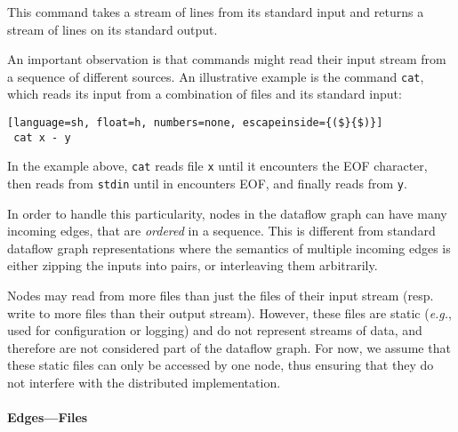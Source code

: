 \documentclass[sigplan,10pt,review,anonymous]{acmart}
\newcommand{\eg}{{\em e.g.}, }
\newcommand{\ttt}[1]{\texttt{\small #1}}
\newcommand{\TODO}[1]{\hl{\textbf{TODO:} #1}\xspace}
\begin{document}
\noindent
This command takes a stream of lines from its standard input and
returns a stream of lines on its standard output.

An important
observation is that commands might read their input
stream from a sequence of different sources. An illustrative example
is the command \ttt{cat}, which reads its input from a combination
of files and its standard input:

\begin{lstlisting}[language=sh, float=h, numbers=none, escapeinside={($}{$)}]
 cat x - y
\end{lstlisting}

\noindent
In the example above, \ttt{cat} reads file \ttt{x} until it encounters the EOF
character, then reads from \ttt{stdin} until in encounters EOF, and finally reads from
\ttt{y}.

In order to handle this particularity, nodes in the
dataflow graph can have many incoming edges, that are \emph{ordered} in a
sequence. This is different from standard dataflow
graph representations where the semantics of multiple incoming edges
is either zipping the inputs into pairs, or interleaving them arbitrarily.


Nodes may read from more files than just the files of their
input stream (resp. write to more files than their output stream).
However, these files are static (\eg used for configuration or
logging) and do not represent streams of data, and therefore are not
considered part of the dataflow graph.
For now, we assume that these static
files can only be accessed by one node, thus ensuring that they do not
interfere with the distributed implementation.

\paragraph{Edges---Files}
\end{document}
